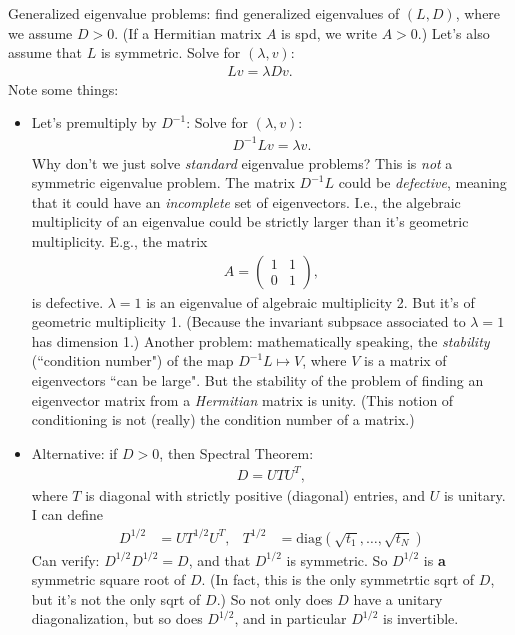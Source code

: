 \documentclass[10pt]{amsart}
\begin{document}
Generalized eigenvalue problems: find generalized eigenvalues of $(L,D)$, where we assume $D > 0$. (If a Hermitian matrix $A$ is spd, we write $A > 0$.) Let's also assume that $L$ is symmetric. Solve for $(\lambda, v)$:
\begin{align*}
  L v = \lambda D v.
\end{align*}
Note some things:
\begin{itemize}
  \item Let's premultiply by $D^{-1}$: Solve for $(\lambda, v)$:
    \begin{align*}
      D^{-1} L v = \lambda v.
    \end{align*}
    Why don't we just solve \textit{standard} eigenvalue problems? This is \textit{not} a symmetric eigenvalue problem. The matrix $D^{-1} L$ could be \textit{defective}, meaning that it could have an \textit{incomplete} set of eigenvectors. I.e., the algebraic multiplicity of an eigenvalue could be strictly larger than it's geometric multiplicity. E.g., the matrix
    \begin{align*}
      A = \left(\begin{array}{cc} 
                1 & 1 \\
                0 & 1
      \end{array}\right),
    \end{align*}
    is defective. $\lambda = 1$ is an eigenvalue of algebraic multiplicity 2. But it's of geometric multiplicity 1. (Because the invariant subpsace associated to $\lambda = 1$ has dimension 1.) Another problem: mathematically speaking, the \textit{stability} (``condition number") of the map $D^{-1} L \mapsto V$, where $V$ is a matrix of eigenvectors ``can be large". But the stability of the problem of finding an eigenvector matrix from a \textit{Hermitian} matrix is unity. (This notion of conditioning is not (really) the condition number of a matrix.)

  \item Alternative: if $D > 0$, then Spectral Theorem:
    \begin{align*}
      D = U T U^T,
    \end{align*}
    where $T$ is diagonal with strictly positive (diagonal) entries, and $U$ is unitary. I can define
    \begin{align*}
      D^{1/2} &= U T^{1/2} U^T, & T^{1/2} &= \mathrm{diag}\left(\sqrt{t_1}, \ldots, \sqrt{t_N}\right)
    \end{align*}
    Can verify: $D^{1/2} D^{1/2} = D$, and that $D^{1/2}$ is symmetric. So $D^{1/2}$ is \textbf{a} symmetric square root of $D$. (In fact, this is the only symmetrtic sqrt of $D$, but it's not the only sqrt of $D$.) So not only does $D$ have a unitary diagonalization, but so does $D^{1/2}$, and in particular $D^{1/2}$ is invertible. 


\end{itemize}
\end{document}
